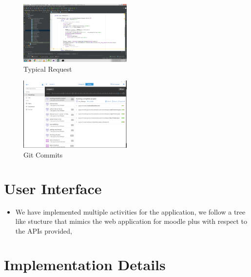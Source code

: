 \documentclass[12pt]{article}
\begin{document}
\begin{figure}[!ht]
	\centering
	\includegraphics[width=0.5\textwidth]{./request}
	\caption{Typical Request}
\end{figure}


\begin{figure}[!ht]
	\centering
	\includegraphics[width=0.5\textwidth]{./git}
	\caption{Git Commits}
\end{figure}


\section{User Interface}
\begin{itemize}
\item We have implemented multiple activities for the application, we follow a tree like stucture that mimics the web application for moodle plus with respect to the APIs provided, 

\end{itemize}

\section{Implementation Details}
\end{document}
